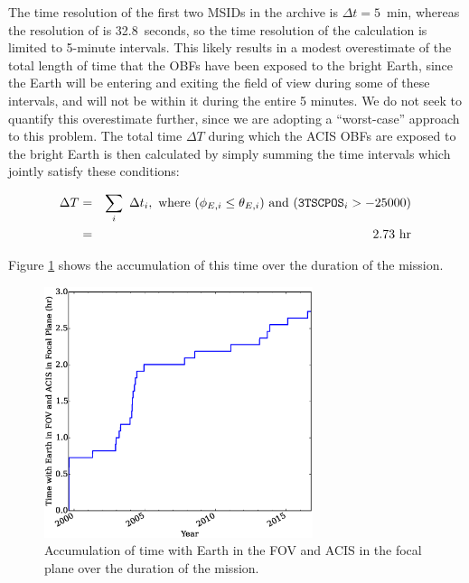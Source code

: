 \documentclass[11pt]{article}
\begin{document}
The time resolution of the first two MSIDs in the archive is $\Delta{t} = 5$~min, whereas the resolution
of  is 32.8~seconds, so the time resolution of the calculation is limited to 5-minute intervals.
This likely results in a modest overestimate of the total length of time that the OBFs have been exposed to
the bright Earth, since the Earth will be entering and exiting the field of view during some of these intervals,
and will not be within it during the entire 5 minutes. We do not seek to quantify this overestimate further,
since we are adopting a ``worst-case'' approach to this problem. The total time $\Delta{T}$ during which the ACIS
OBFs are exposed to the bright Earth is then calculated by simply summing the time intervals which jointly satisfy
these conditions:

\begin{eqnarray}
\Delta{T} &=& \displaystyle\sum_i~\Delta{t_i},~{\rm where}~(\phi_{E,i} \leq \theta_{E,i})~{\rm and}~(\texttt{3TSCPOS}_i > -25000) \\
\nonumber &=& 2.73~{\rm hr}
\end{eqnarray}

\noindent
Figure \ref{fig:time_accum} shows the accumulation of this time over the duration of the mission.

\begin{figure}
\begin{center}
\includegraphics[width=0.7\textwidth]{time_accum.eps}
\caption{Accumulation of time with Earth in the FOV and ACIS in the focal plane over the duration of the mission.\label{fig:time_accum}}
\end{center}
\end{figure}
\end{document}
